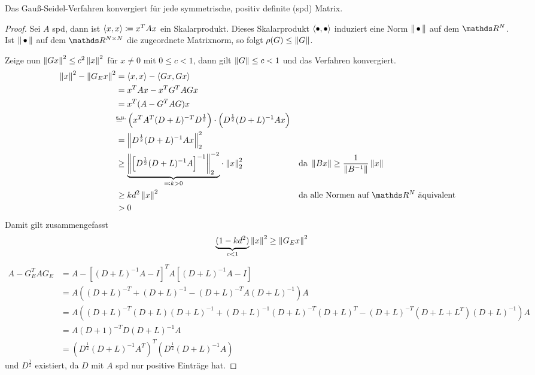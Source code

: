 \begin{Satze}
  Das Gauß-Seidel-Verfahren konvergiert für jede symmetrische, positiv
  definite (spd) Matrix.

  \begin{proof}
    Sei $A$ spd, dann ist $\scp{x}{x}\coloneqq x^T Ax$ ein Skalarprodukt.
    Dieses Skalarprodukt $\scp{\bullet}{\bullet}$ induziert eine
    Norm $\nn$ auf dem $\R^N$.
    Ist $\nn$ auf dem $\R^{N\times N}$ die zugeordnete
    Matrixnorm, so folgt $\rho(G) \leq \nn[G]$.

    Zeige nun $\nn[Gx]^2\leq c^2\nn[x]^2$ für $x\neq 0$ mit $0\leq c<1$,
    dann gilt $\nn[G]\leq c<1$ und das Verfahren konvergiert.
    \begin{align*}
      \nn[x]^2-\nn[G_Ex]^2 &= \scp{x}{x}-\scp{Gx}{Gx} \\
                           &= x^TAx-x^TG^TAGx \\
                           &=x^T(A-G^TAG)x\\
                           &\mathrlap{=}^\text{s.u.} \left(
                             x^TA^T(D+L)^{-T}D^{\frac{1}{2}}
                             \right)
                             \cdot \left(
                             D^{\frac{1}{2}}(D+L)^{-1}Ax
                             \right)\\
                           &=\nn[D^{\frac{1}{2}}(D+L)^{-1}Ax]_2^2\\
                           &\geq {\underbrace{%
                             \nn[{\left[
                             D^{\frac{1}{2}}(D+L)^{-1}A
                             \right]^{-1}}]_2^{-2}}_{%
                             \eqqcolon k>0}}
                             \cdot\nn[x]_2^{2}
                           && \text{da } \nn[Bx]\geq \frac{1}{\nn[B^{-1}]}\nn[x]\\
                           &\geq kd^2\nn[x]^2
                           &&\text{da alle Normen auf $\R^N$ äquivalent}\\
                           &>0
    \end{align*}
Damit gilt zusammengefasst
\begin{gather*}
  \underbrace{(1-kd^2)}_{c<1}\nn[x]^2\geq \nn[G_Ex]^2
\end{gather*}
\begin{align*}
  A-G_E^TAG_E &=A-\left[(D+L)^{-1}A-I\right]^TA\left[(D+L)^{-1}A-I\right]\\
              &=A\left((D+L)^{-T}+(D+L)^{-1}-(D+L)^{-T}A(D+L)^{-1}\right)A\\
              &=A\left((D+L)^{-T}(D+L)(D+L)^{-1}
                +(D+L)^{-1}(D+L)^{-T}(D+L)^T
                -(D+L)^{-T}(D+L+L^T)(D+L)^{-1}\right)A\\
              &=A(D+1)^{-T}D(D+L)^{-1}A\\
              &=\left(D^\frac{1}{2}(D+L)^{-1}A^T\right)^T
                \left(D^\frac{1}{2}(D+L)^{-1}A\right)
\end{align*}
und $D^{\frac{1}{2}}$ existiert, da $D$ mit $A$ spd 
nur positive Einträge hat.
  \end{proof}
\end{Satze}


